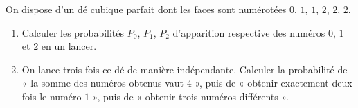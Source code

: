 \begin{annales}
On dispose d'un dé cubique parfait dont les faces sont numérotées $0$, $1$,
$1$, $2$, $2$, $2$.
\begin{enumerate}[label=\textbf{\alph*)}, leftmargin=*, itemsep=0.15em]
  \item Calculer les probabilités $P_{0}$, $P_{1}$, $P_{2}$ d'apparition
        respective des numéros $0$, $1$ et $2$ en un lancer.
  \item On lance trois fois ce dé de manière indépendante. Calculer la
        probabilité de « la somme des numéros obtenus vaut $4$ », puis de
        « obtenir exactement deux fois le numéro $1$ », puis de « obtenir
        trois numéros différents ».
\end{enumerate}
\end{annales}

